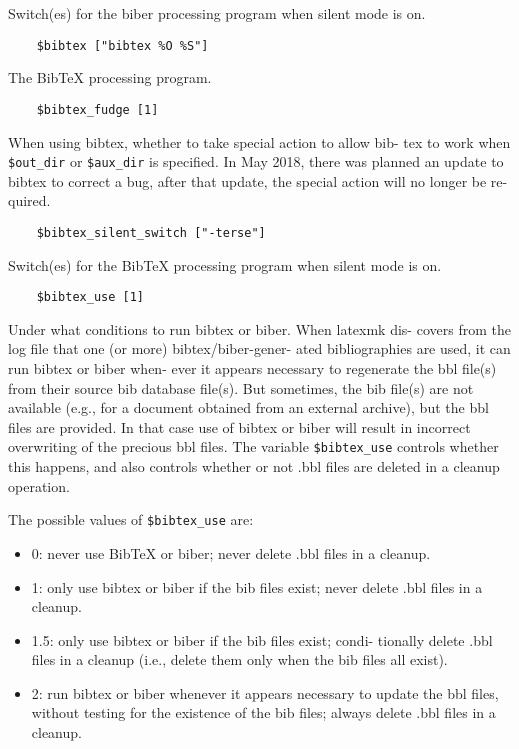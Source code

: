 Switch(es)  for the biber processing program when silent mode is
on.

\begin{verbatim}
	$bibtex ["bibtex %O %S"]
\end{verbatim}

The BibTeX processing program.

\begin{verbatim}
	$bibtex_fudge [1]
\end{verbatim}

When using bibtex, whether to take special action to allow  bib-
tex  to  work  when  \verb|$out_dir|  or \verb|$aux_dir| is specified.  In May
2018, there was planned an update to bibtex to  correct  a  bug,
after  that  update,  the  special  action will no longer be re-
quired.

\begin{verbatim}
	$bibtex_silent_switch ["-terse"]
\end{verbatim}

Switch(es) for the BibTeX processing program when silent mode is
on.

\begin{verbatim}
	$bibtex_use [1]
\end{verbatim}

Under what conditions to run bibtex or biber.  When latexmk dis-
covers from the log file that one (or more)  bibtex/biber-gener-
ated  bibliographies  are used, it can run bibtex or biber when-
ever it appears necessary to regenerate  the  bbl  file(s)  from
their  source  bib  database  file(s).   But  sometimes, the bib
file(s) are not available (e.g., for a document obtained from an
external archive), but the bbl files are provided.  In that case
use of bibtex or biber will result in incorrect  overwriting  of
the  precious  bbl  files.   The  variable  \verb|$bibtex_use| controls
whether this happens, and also  controls  whether  or  not  .bbl
files are deleted in a cleanup operation.

The possible values of \verb|$bibtex_use| are:

\begin{itemize}
\item 0:  never  use  BibTeX  or biber; never delete .bbl files in a cleanup.
\item 1: only use bibtex or biber if  the  bib  files  exist;  never delete
				.bbl files in a cleanup.

\item 1.5:  only  use bibtex or biber if the bib files exist; condi- tionally
				delete .bbl files in a cleanup (i.e., delete them  only when the bib
								files all exist).

\item 2: run bibtex or biber whenever it appears necessary to update the bbl
				files, without testing for  the  existence  of  the  bib files; always
								delete .bbl files in a cleanup.
\end{itemize}


